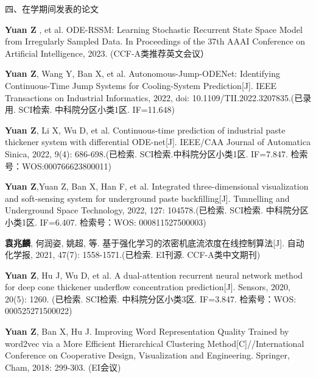 \noindent 四、在学期间发表的论文 \par
\begin{enumerate}[label={[\arabic*]}]  %
\item \textbf{Yuan Z} , et al. ODE-RSSM: Learning Stochastic Recurrent State Space Model from Irregularly Sampled Data. In Proceedings of the 37th AAAI Conference on Artificial Intelligence, 2023. (CCF-A类推荐英文会议）
\item \textbf{Yuan Z}, Wang Y, Ban X, et al. Autonomous-Jump-ODENet: Identifying Continuous-Time Jump Systems for Cooling-System Prediction[J]. IEEE Transactions on Industrial Informatics, 2022, doi: 10.1109/TII.2022.3207835.(已录用. SCI检索. 中科院分区小类1区. IF=11.648) 
\item \textbf{Yuan Z}, Li X, Wu D, et al. Continuous-time prediction of industrial paste thickener system with differential ODE-net[J]. IEEE/CAA Journal of Automatica Sinica, 2022, 9(4): 686-698.(已检索. SCI检索.中科院分区小类1区. IF=7.847. 检索号：WOS:000766623800011)  
\item \textbf{Yuan Z},Yuan Z, Ban X, Han F, et al. Integrated three-dimensional visualization and soft-sensing system for underground paste backfilling[J]. Tunnelling and Underground Space Technology, 2022, 127: 104578.(已检索. SCI检索. 中科院分区小类1区. IF=6.407. 检索号：WOS: 000811527500003) 
\item \textbf{袁兆麟}, 何润姿, 姚超, 等. 基于强化学习的浓密机底流浓度在线控制算法[J]. 自动化学报, 2021, 47(7): 1558-1571.(已检索. EI刊源. CCF-A类中文期刊) 
\item \textbf{Yuan Z}, Hu J, Wu D, et al. A dual-attention recurrent neural network method for deep cone thickener underflow concentration prediction[J]. Sensors, 2020, 20(5): 1260. (已检索. SCI检索. 中科院分区小类3区. IF=3.847. 检索号：WOS: 000525271500022)  
\item \textbf{Yuan Z}, Ban X, Hu J. Improving Word Representation Quality Trained by word2vec via a More Efficient Hierarchical Clustering Method[C]//International Conference on Cooperative Design, Visualization and Engineering. Springer, Cham, 2018: 299-303. (EI会议)

\end{enumerate}
